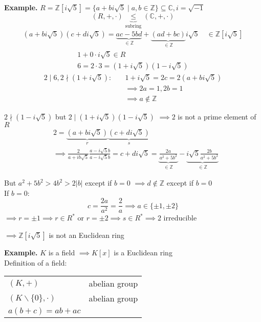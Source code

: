 \textbf{Example.}
$R = \mathbb{Z} [i \sqrt{5}] = \{a+bi \sqrt{5} \mid a,b \in \mathbb{Z} \} \subseteq \mathbb{C}, i = \sqrt{-1}$
\[(R,+,\cdot) \underbrace{\leq}_{\text{subring}} (\mathbb{C}, +,\cdot)\]
\begin{align*}
  (a+bi \sqrt{5}) (c+di\sqrt{5}) =
    \underbrace{ac - 5bd}_{\in \mathbb{Z}} + \underbrace{(ad+bc)}_{\in \mathbb{Z}} i\sqrt{5} \quad \in \mathbb{Z}[i\sqrt{5}]
\end{align*}
\begin{align*}
  1+0 \cdot i\sqrt{5} \in R\\
  6 = 2 \cdot 3 = (1+i\sqrt{5})(1-i\sqrt{5})
\end{align*}
\begin{align*}
  2∣6, 2 \nmid (1+i\sqrt{5}): \quad & 1+i\sqrt{5} = 2c = 2(a+bi\sqrt{5}) \\
    & \implies 2a = 1, 2b = 1 \\
    & \implies a \not\in \mathbb{Z}
\end{align*}

$2 \nmid (1 - i\sqrt{5})$ but $2 ∣ (1+i\sqrt{5})(1-i\sqrt{5})$
$\implies 2$ is not a prime element of $R$
\begin{align*}
  & 2 = \underbrace{(a+bi \sqrt{5})}_{r} \underbrace{(c+di\sqrt{5})}_{s}\\
  & \implies \frac{2}{a+ib\sqrt{5}} \frac{a-i\sqrt{5}b}{a-i\sqrt{5}b}
  = c+di\sqrt{5}
= \underbrace{\frac{2a}{a^2 + 5b^2}}_{\in \mathbb{Z}} - \underbrace{i\sqrt{5} \frac{2b}{a^2 + 5b^2}}_{\in \mathbb{Z}}
\end{align*}

But $a^2 + 5b^2 > 4b^2 > 2|b|$ except if $ b=0$ $\implies d \not\in \mathbb{Z}$ except if $b=0$ \\

If $b=0:$
\[ c = \frac{2a}{a^2} = \frac{2}{a} \implies a \in \{\pm 1, \pm 2\} \]
$\implies r = \pm 1 \implies r \in R^{*}$ or $ r = \pm 2 \implies s \in R^{*} \implies 2 $ irreducible

$\implies \mathbb{Z}[i\sqrt{5}]$ is not an Euclidean ring

\textbf{Example.}
$K$ is a field $\implies K[x]$ is a Euclidean ring\\

Definition of a field:
\begin{tabular}{ll}
  $(K,+)$ &abelian group \\
  $(K\backslash \{0\}, \cdot)$ & abelian group \\
  $a(b+c) = ab + ac$
\end{tabular}

